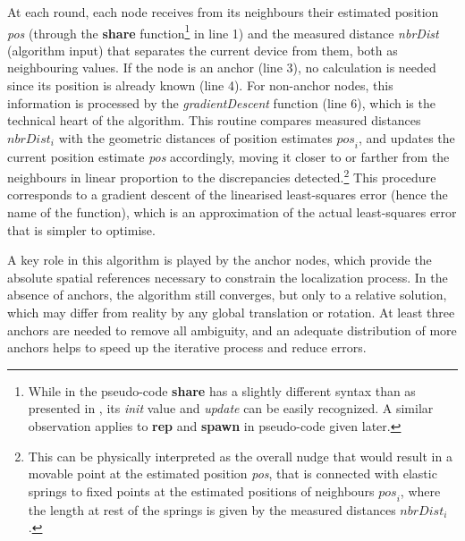 \documentclass[runningheads]{llncs}
\begin{document}
At each round, each node receives from its neighbours their estimated position \emph{pos} (through the \textbf{share} function\footnote{While in the pseudo-code \textbf{share} has a slightly different syntax than as presented in , its {\em init} value and {\em update} can be easily recognized. A similar observation applies to \textbf{rep} and \textbf{spawn} in pseudo-code given later.} in line 1) and the measured distance \emph{nbrDist} (algorithm input) that separates the current device from them, both as neighbouring values. If the node is an anchor (line 3), no calculation is needed since its position is already known (line 4). For non-anchor nodes, this information is processed by the \emph{gradientDescent} function (line 6), which is the technical heart of the algorithm. This routine compares measured distances $\mathit{nbrDist}_i$ with the geometric distances of position estimates $\mathit{pos}_i$, and updates the current position estimate \emph{pos} accordingly, moving it closer to or farther from the neighbours in linear proportion to the discrepancies detected.\footnote{This can be physically interpreted as the overall nudge that would result in a movable point at the estimated position \emph{pos}, that is connected with elastic springs to fixed points at the estimated positions of neighbours $\mathit{pos}_i$, where the length at rest of the springs is given by the measured distances $\mathit{nbrDist}_i$.} This procedure corresponds to a gradient descent of the linearised least-squares error (hence the name of the function), which is an approximation of the actual least-squares error that is simpler to optimise.

A key role in this algorithm is played by the anchor nodes, which provide the absolute spatial references necessary to constrain the localization process. In the absence of anchors, the algorithm still converges, but only to a relative solution, which may differ from reality by any global translation or rotation. At least three anchors are needed to remove all ambiguity, and an adequate distribution of more anchors helps to speed up the iterative process and reduce errors.
\end{document}
